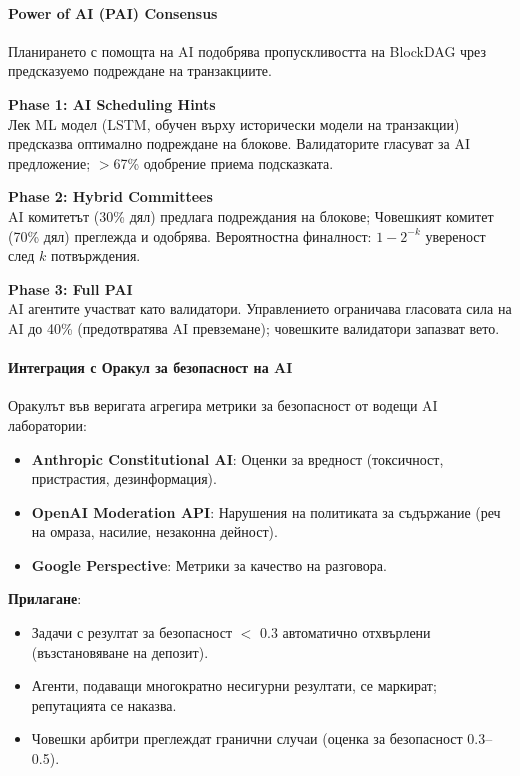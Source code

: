 \documentclass[11pt]{article}
\begin{document}
\paragraph{Power of AI (PAI) Consensus}
Планирането с помощта на AI подобрява пропускливостта на BlockDAG чрез предсказуемо подреждане на транзакциите.

\textbf{Phase 1: AI Scheduling Hints}\\
Лек ML модел (LSTM, обучен върху исторически модели на транзакции) предсказва оптимално подреждане на блокове. Валидаторите гласуват за AI предложение; $>$67\% одобрение приема подсказката.

\textbf{Phase 2: Hybrid Committees}\\
AI комитетът (30\% дял) предлага подреждания на блокове; Човешкият комитет (70\% дял) преглежда и одобрява. Вероятностна финалност: $1 - 2^{-k}$ увереност след $k$ потвърждения.

\textbf{Phase 3: Full PAI}\\
AI агентите участват като валидатори. Управлението ограничава гласовата сила на AI до 40\% (предотвратява AI превземане); човешките валидатори запазват вето.

\paragraph{Интеграция с Оракул за безопасност на AI}
Оракулът във веригата агрегира метрики за безопасност от водещи AI лаборатории:
\begin{itemize}[noitemsep]
  \item \textbf{Anthropic Constitutional AI}: Оценки за вредност (токсичност, пристрастия, дезинформация).
  \item \textbf{OpenAI Moderation API}: Нарушения на политиката за съдържание (реч на омраза, насилие, незаконна дейност).
  \item \textbf{Google Perspective}: Метрики за качество на разговора.
\end{itemize}

\textbf{Прилагане}:
\begin{itemize}[noitemsep]
  \item Задачи с резултат за безопасност $<$ 0.3 автоматично отхвърлени (възстановяване на депозит).
  \item Агенти, подаващи многократно несигурни резултати, се маркират; репутацията се наказва.
  \item Човешки арбитри преглеждат гранични случаи (оценка за безопасност 0.3--0.5).
\end{itemize}
\end{document}
